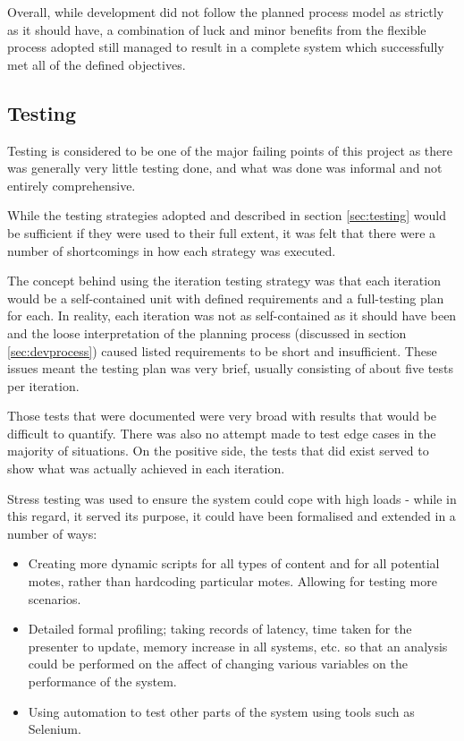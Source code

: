 \documentclass[a4papert,11pt,notitlepage]{article}
\begin{document}
Overall, while development did not follow the planned process model as strictly as it should have, a combination of luck and minor benefits from the flexible process adopted still managed to result in a complete system which successfully met all of the defined objectives.

\subsection{Testing}
\label{sec:evaltesting}
Testing is considered to be one of the major failing points of this project as there was generally very little testing done, and what was done was informal and not entirely comprehensive.

While the testing strategies adopted and described in section \ref{sec:testing} would be sufficient if they were used to their full extent, it was felt that there were a number of shortcomings in how each strategy was executed.

The concept behind using the iteration testing strategy was that each iteration would be a self-contained unit with defined requirements and a full-testing plan for each. In reality, each iteration was not as self-contained as it should have been and the loose interpretation of the planning process (discussed in section \ref{sec:devprocess}) caused listed requirements to be short and insufficient. These issues meant the testing plan was very brief, usually consisting of about five tests per iteration.

Those tests that were documented were very broad with results that would be difficult to quantify. There was also no attempt made to test edge cases in the majority of situations. On the positive side, the tests that did exist served to show what was actually achieved in each iteration.

Stress testing was used to ensure the system could cope with high loads - while in this regard, it served its purpose, it could have been formalised and extended in a number of ways:
\begin{itemize}
\item Creating more dynamic scripts for all types of content and for all potential motes, rather than hardcoding particular motes. Allowing for testing more scenarios.
\item Detailed formal profiling; taking records of latency, time taken for the presenter to update, memory increase in all systems, etc. so that an analysis could be performed on the affect of changing various variables on the performance of the system.
\item Using automation to test other parts of the system using tools such as Selenium\cite{selenium:web}.
\end{itemize}
\end{document}
